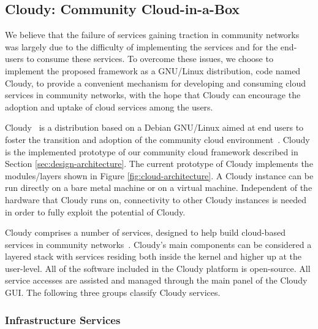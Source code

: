 



\subsection{Cloudy: Community Cloud-in-a-Box}
\label{sec:implementation}

We believe that the failure of services gaining traction in community networks was largely due to the difficulty of implementing the services and for the end-users to consume these services. To overcome these issues, we choose to implement the proposed framework as a GNU/Linux distribution, code named Cloudy, to provide a convenient mechanism for developing and consuming cloud services in community networks, with the hope that Cloudy can encourage the adoption and uptake of cloud services among the users.

Cloudy~\cite{Cloudy} is a distribution based on a Debian GNU/Linux aimed at end users to foster the transition and adoption of the community cloud environment~\cite{Jimenez2014,Jimenez2013}. 
Cloudy is the implemented prototype of our community cloud framework described in Section \ref{sec:design-architecture}. 
The current prototype of Cloudy implements the modules/layers shown in Figure \ref{fig:cloud-architecture}. A Cloudy instance can be run directly on a bare metal machine or on a virtual machine. Independent of the hardware that Cloudy runs on, connectivity to other Cloudy instances is needed in order to fully exploit the potential of Cloudy.

Cloudy comprises a number of services, designed to help build cloud-based services in community networks~\cite{Selimi2015Cloud}. 
Cloudy's main components can be considered a layered stack with services residing both inside the kernel and higher up at the user-level. All of the software included in the Cloudy platform is open-source. All service accesses are assisted and managed through the main panel of the Cloudy GUI. The following three groups classify Cloudy services.

\subsubsection{Infrastructure Services}

